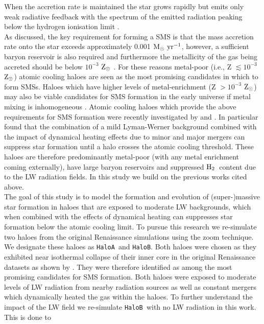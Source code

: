 \documentclass[graphics, twocolumn, usenatbib]{mn2e}
\newcommand{\msolaryrc} {$\rm{M_{\odot}~yr^{-1}}$}
\newcommand{\zsolar} {$\rm{Z_{\odot}}~$}
\newcommand{\zsolarc} {$\rm{Z_{\odot}}$}
\newcommand{\molH} {$\rm{H_2}$~}
\newcommand{\ha} {\texttt{HaloA~}}
\newcommand{\hb} {\texttt{HaloB~}}
\newcommand{\hbc} {\texttt{HaloB}}
\begin{document}
When the accretion rate is maintained the star grows rapidly but emits
only weak radiative feedback with the spectrum of the emitted radiation peaking below
the hydrogen ionisation limit \citep{Woods_2018}. \\
\indent As discussed, the key requirement for
forming a SMS is that the mass accretion rate onto the star exceeds approximately 0.001 \msolaryrc,
however, a sufficient baryon reservoir is also required and furthermore the metallicity of the gas
being accreted should be below $10^{-3}$ \zsolar \citep{Chon_2020}. For these reasons
metal-poor (i.e., Z $\lesssim 10^{-3}$ \zsolarc) atomic cooling haloes are seen as the most 
promising candidates in which to form SMSs. Haloes which have higher levels of 
metal-enrichment (Z $> 10^{-3}$ \zsolarc) may also be viable candidates for 
SMS formation in the early universe if metal mixing is inhomogeneous \citep{Regan_2020a}. Atomic cooling
haloes which provide the above requirements for SMS formation were recently investigated by \cite{Wise_2019}
and \cite{Regan_2020}. In particular \cite{Wise_2019} found that the combination 
of a mild Lyman-Werner background combined with the impact of dynamical heating effects due to
minor and major mergers can suppress star formation until a halo crosses the atomic cooling threshold.
These haloes are therefore predominantly metal-poor (with any metal enrichment coming externally), have large 
baryon reservoirs and suppressed \molH content due to the LW radiation fields. 
In this study we build on the previous works cited above. \\
\indent The goal of this study is to model the formation and evolution of (super-)massive star
formation in haloes that are exposed to moderate LW backgrounds, which when combined with
the effects of dynamical heating can suppresses star formation below the atomic cooling limit.
  To pursue this research we re-simulate
  two haloes from the original Renaissance simulations using the zoom technique.
  We designate
  these haloes as \ha and \hbc. Both haloes were chosen as they exhibited near isothermal
  collapse of their inner core in the original Renaissance datasets as shown by \cite{Regan_2020}.
  They were therefore identified as among the most promising candidates for SMS formation. Both
  haloes were exposed to moderate levels of LW radiation from nearby radiation sources as well as
  constant mergers which dynamically heated the gas within the haloes. To further understand the
  impact of the LW field we re-simulate \hb with no LW radiation in this work. This is done to
\end{document}
